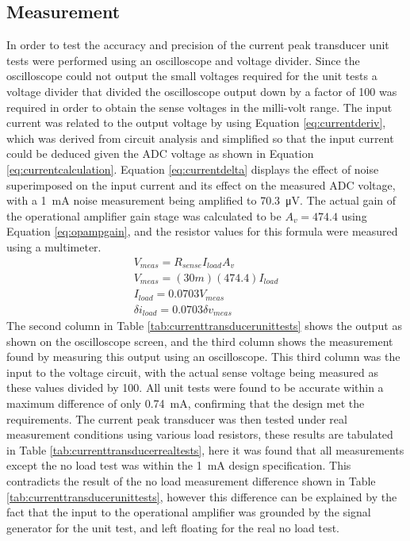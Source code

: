 \subsection{Measurement} \label{sec:itrans_meas}
In order to test the accuracy and precision of the current peak transducer unit tests were performed using an oscilloscope and voltage divider. Since the oscilloscope could not output the small voltages required for the unit tests a voltage divider that divided the oscilloscope output down by a factor of 100 was required in order to obtain the sense voltages in the milli-volt range. The input current was related to the output voltage by using Equation \ref{eq:currentderiv}, which was derived from circuit analysis and simplified so that the input current could be deduced given the ADC voltage as shown in Equation \ref{eq:currentcalculation}. Equation \ref{eq:currentdelta} displays the effect of noise superimposed on the input current and its effect on the measured ADC voltage, with a \SI{1}{\milli A} noise measurement being amplified to \SI{70.3}{\micro \volt}. The actual gain of the operational amplifier gain stage was calculated to be $A_{v}=474.4$ using Equation \ref{eq:opampgain}, and the resistor values for this formula were measured using a multimeter.
\begin{align}
    V_{meas}=R_{sense}I_{load}A_{v}  \label{eq:currentderiv}\\
    V_{meas}=(30m)(474.4)I_{load} \nonumber \\
    I_{load}= 0.0703V_{meas} \label{eq:currentcalculation} \\
    \delta i_{load}= 0.0703\delta v_{meas} \label{eq:currentdelta}
\end{align} 
The second column in Table \ref{tab:currenttransducerunittests} shows the output as shown on the oscilloscope screen, and the third column shows the measurement found by measuring this output using an oscilloscope. This third column was the input to the voltage circuit, with the actual sense voltage being measured as these values divided by 100. All unit tests were found to be accurate within a maximum difference of only \SI{0.74}{\milli A}, confirming that the design met the requirements. \vspace{4mm} \newline 
The current peak transducer was then tested under real measurement conditions using various load resistors, these results are tabulated in Table \ref{tab:currenttransducerrealtests}, here it was found that all measurements except the no load test was within the \SI{1}{\milli A} design specification. This contradicts the result of the no load measurement difference shown in Table \ref{tab:currenttransducerunittests}, however this difference can be explained by the fact that the input to the operational amplifier was grounded by the signal generator for the unit test, and left floating for the real no load test. \vspace{4mm} \newline  
